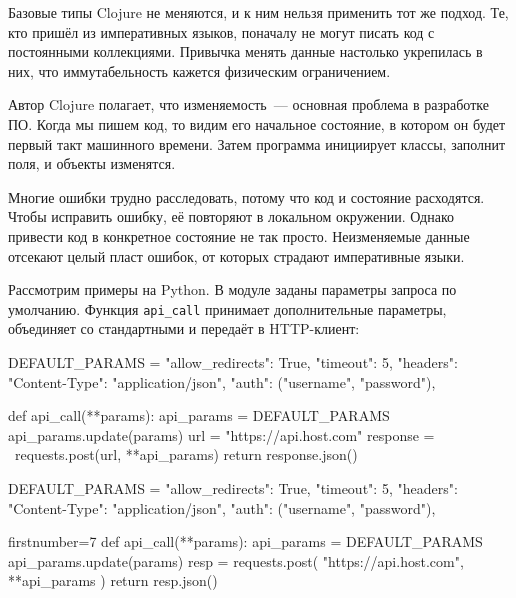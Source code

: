 Базовые типы Clojure не меняются, и к ним нельзя применить тот же подход. Те,
кто пришёл из императивных языков, поначалу не могут писать код с постоянными
коллекциями. Привычка менять данные настолько укрепилась в них, что
иммутабельность кажется физическим ограничением.

Автор Clojure полагает, что изменяемость~--- основная проблема в разработке
ПО. Когда мы пишем код, то видим его начальное состояние, в котором он будет
первый такт машинного времени. Затем программа инициирует классы, заполнит поля,
и объекты изменятся.

Многие ошибки трудно расследовать, потому что код и состояние расходятся. Чтобы
исправить ошибку, её повторяют в локальном окружении. Однако привести код в
конкретное состояние не так просто. Неизменяемые данные отсекают целый пласт
ошибок, от которых страдают императивные языки.


Рассмотрим примеры на Python. В модуле заданы параметры запроса по
умолчанию. Функция \verb|api_call| принимает дополнительные параметры,
объединяет со стандартными и передаёт в HTTP-клиент:

\ifnarrow

\begin{english}
  \begin{python/lines}
DEFAULT_PARAMS = {
    "allow_redirects": True,
    "timeout": 5,
    "headers": {"Content-Type":
                "application/json"},
    "auth": ("username", "password"),
}

def api_call(**params):
    api_params = DEFAULT_PARAMS
    api_params.update(params)
    url = "https://api.host.com"
    response = \
      requests.post(url, **api_params)
    return response.json()
  \end{python/lines}
\end{english}

\else

\begin{english}
  \begin{python/lines}
DEFAULT_PARAMS = {
    "allow_redirects": True,
    "timeout": 5,
    "headers": {"Content-Type": "application/json"},
    "auth": ("username", "password"),
}
  \end{python/lines}
\end{english}

\pagebreaklarge

\begin{english}
  \begin{python/lines*}{firstnumber=7}
def api_call(**params):
    api_params = DEFAULT_PARAMS
    api_params.update(params)
    resp = requests.post(
        "https://api.host.com", **api_params
    )
    return resp.json()
  \end{python/lines*}
\end{english}


